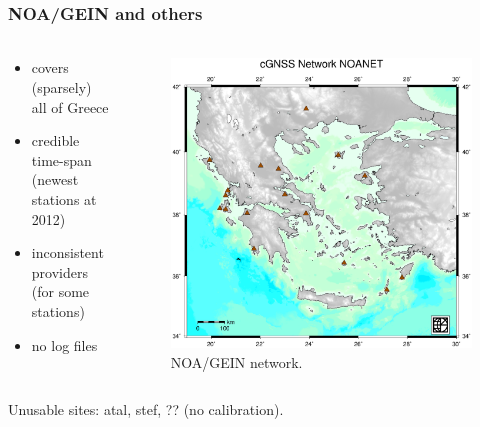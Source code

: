 \documentclass{beamer}
\begin{document}
\begin{frame}\frametitle{NOA/GEIN and others}\framesubtitle{}
\begin{columns}[T] %
\begin{column}{.40\textwidth}
  \begin{itemize}
    \item<pro@1-> covers (sparsely) all of Greece 
    \item<pro@1-> credible time-span (newest stations at 2012)
    \item<con@1-> inconsistent providers (for some stations)
    \item<con@1-> no log files
  \end{itemize}
\end{column}%
\hfill%
\begin{column}{.60\textwidth}
 \begin{figure}
 \begin{center}
 \includegraphics[trim={1cm 2cm 1cm 2.5cm},clip,width=.9\textwidth]{img/noanet.eps}
 \caption{NOA/GEIN network.}
 \label{fig:noa}
 \end{center}
 \end{figure}
\end{column}%
\end{columns}
  \begin{block}{}
    Unusable sites: atal, stef, ?? (no calibration).
  \end{block}
\end{frame}
\end{document}
